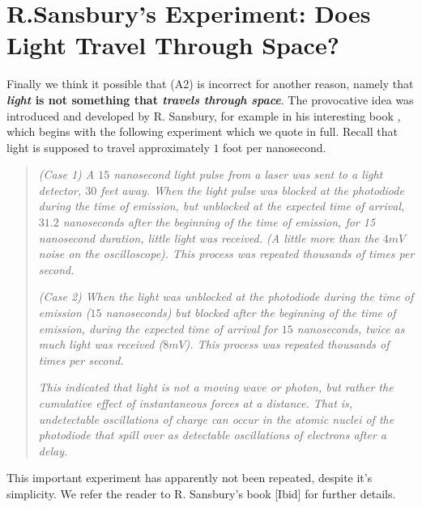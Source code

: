 \documentclass[12pt]{amsart}
\theoremstyle{definition}
\theoremstyle{remark}
\begin{document}
\section{R.Sansbury's Experiment: Does Light Travel Through Space?}
Finally we think it possible that (A2) is incorrect for another reason, namely that \textbf{\emph{light} is not something that \emph{travels through space}}. The provocative idea was introduced and developed by R. Sansbury, for example in his interesting book \cite{sansburyspeed}, which begins with the following experiment which we quote in full. Recall that light is supposed to travel approximately $1$ foot per nanosecond.
\begin{quote}
\emph{ (Case 1) A $15$ nanosecond light pulse from a laser was sent to a light detector, $30$ feet away. When the light pulse was blocked at the photodiode during the time of emission, but unblocked at the expected time of arrival, $31.2$ nanoseconds after the beginning of the time of emission, for 15 nanosecond duration, little light was received. (A little more than the $4mV$ noise on the oscilloscope). This process was repeated thousands of times per second.}

\emph{(Case 2) When the light was unblocked at the photodiode during the time of emission ($15$ nanoseconds) but blocked after the beginning of the time of emission, during the expected time of arrival for $15$ nanoseconds, twice as much light was received ($8mV$). This process was repeated thousands of times per second.}

\emph{This indicated that light is not a moving wave or photon, but rather the cumulative effect of instantaneous forces at a distance. That is, undetectable oscillations of charge can occur in the atomic nuclei of the photodiode that spill over as detectable oscillations of electrons after a delay.}
\end{quote}

This important experiment has apparently not been repeated, despite it's simplicity. We refer the reader to R. Sansbury's book [Ibid] for further details. 

\end{document}
